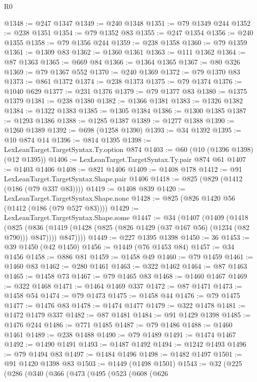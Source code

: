 \begin{lexlean}{R0}
\begin{coremodule}
@1348 := @247 @1347
@1349 := @240 @1348
@1351 := @79 @1349 @244
@1352 := @238 @1351
@1354 := @79 @1352 @83
@1355 := @247 @1354
@1356 := @240 @1355
@1358 := @79 @1356 @244
@1359 := @238 @1358
@1360 := @79 @1359
@1361 := @1309 @83
@1362 := @1360 @1361
@1363 := @111 @1362
@1364 := @87 @1363
@1365 := @669 @84
@1366 := @1364 @1365
@1367 := @80 @326
@1369 := @79 @1367 @552
@1370 := @240 @1369
@1372 := @79 @1370 @83
@1373 := @861 @1372
@1374 := @238 @1373
@1375 := @79 @1374
@1376 := @1040 @629
@1377 := @231 @1376
@1379 := @79 @1377 @83
@1380 := @1375 @1379
@1381 := @238 @1380
@1382 := @1366 @1381
@1383 := @1326 @1382
@1384 := @1322 @1383
@1385 := @1305 @1384
@1386 := @1300 @1385
@1387 := @1293 @1386
@1388 := @1285 @1387
@1389 := @1277 @1388
@1390 := @1260 @1389
@1392 := @698 (@1258 @1390)
@1393 := @34 @1392
@1395 := @10 @874 @14
@1396 := @814 @1395
@1398 := LexLeanTarget.TargetSyntax.Ty.option @874
@1403 := @60 (@10 (@1396 @1398) (@12 @1395))
@1406 := LexLeanTarget.TargetSyntax.Ty.pair @874 @61
@1407 := @1403 @1406
@1408 := @821 @1406
@1409 := @1408 @178
@1412 := @91 LexLeanTarget.TargetSyntax.Shape.pair @1406
@1418 := @825 (@829 (@1412 (@186 (@79 @337 @83))))
@1419 := @1408 @839
@1420 := LexLeanTarget.TargetSyntax.Shape.none
@1428 := @825 (@826 @1420 @56 (@1412 (@186 (@79 @527 @83))))
@1429 := LexLeanTarget.TargetSyntax.Shape.some
@1447 := @34
    (@1407
      (@1409
        (@1418
          (@825
            (@836 (@1419 (@1428 (@825 (@826 @1429 (@37 @167 @56) (@1234 (@82 @790))) @847))))
            @847))))
@1449 := @227 @1395 @1398
@1450 := 36
@1453 := @39 @1450 (@42 @1450)
@1456 := @1449 (@76 @1453 @84)
@1457 := @34 @1456
@1458 := @886 @81
@1459 := @1458 @49
@1460 := @79 @1459
@1461 := @1460 @83
@1462 := @280 @1461
@1463 := @322 @1462
@1464 := @87 @1463
@1465 := @1458 @73
@1467 := @79 @1465 @83
@1468 := @1460 @1467
@1469 := @322 @1468
@1471 := @1464 @1469 @337
@1472 := @87 @1471
@1473 := @1458 @54
@1474 := @79 @1473
@1475 := @1458 @44
@1476 := @79 @1475
@1477 := @1476 @83
@1478 := @1474 @1477
@1479 := @322 @1478
@1481 := @1472 @1479 @337
@1482 := @87 @1481
@1484 := @91 @1429 @1398
@1485 := @1476 @244
@1486 := @771 @1485
@1487 := @79 @1486
@1488 := @1460 @1461
@1489 := @238 @1488
@1490 := @79 @1489
@1491 := @1474 @1467
@1492 := @1490 @1491
@1493 := @1487 @1492
@1494 := @1242 @1493
@1496 := @79 @1494 @83
@1497 := @1484 @1496
@1498 := @1482 @1497
@1501 := @91 @1420 @1398 @83
@1503 := @1449 (@1498 @1501)
@1543 := @32
    (@225
      (@286
        (@340
          (@366
            (@473
              (@495
                (@523
                  (@608
                    (@626

\end{coremodule}
\end{lexlean}
